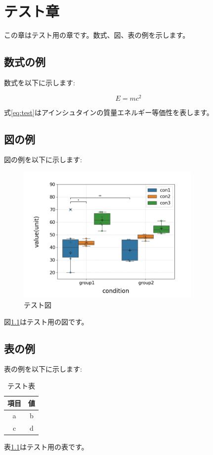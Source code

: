 \chapter{テスト章}

この章はテスト用の章です。数式、図、表の例を示します\cite{example}。

\section{数式の例}

数式を以下に示します:

\begin{equation}
    \label{eq:test}
    E = mc^2
\end{equation}

式\eqref{eq:test}はアインシュタインの質量エネルギー等価性を表します。

\section{図の例}

図の例を以下に示します:

\begin{figure}[H]
    \centering
    \includegraphics[width=0.8\textwidth]{figures/test/test.png} %
    \caption{テスト図}
    \label{fig:test}
\end{figure}

図\ref{fig:test}はテスト用の図です。

\section{表の例}

表の例を以下に示します:

\begin{table}[H]
    \centering
    \caption{テスト表}
    \label{tab:test}
    \begin{tabular}{|c|c|}
        \hline
        項目 & 値 \\
        \hline
        a & b \\
        c & d \\
        \hline
    \end{tabular}
\end{table}

表\ref{tab:test}はテスト用の表です。
